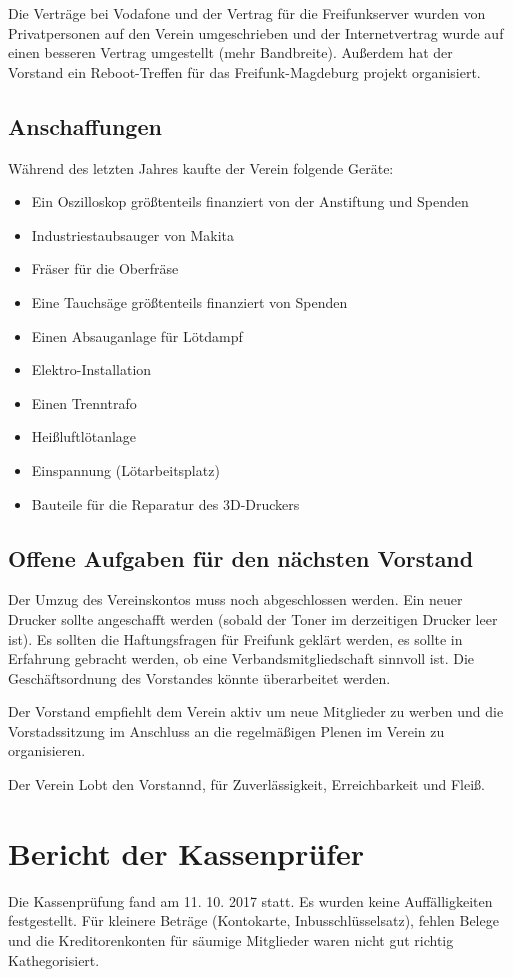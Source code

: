 \documentclass[a4paper,12pt,titlepage]{scrartcl}
\begin{document}
Die Verträge bei Vodafone und der Vertrag für die Freifunkserver wurden von Privatpersonen auf den Verein umgeschrieben und der Internetvertrag wurde auf einen besseren Vertrag umgestellt (mehr Bandbreite). Außerdem hat der Vorstand ein Reboot-Treffen für das Freifunk-Magdeburg projekt organisiert.


\subsection{Anschaffungen}

Während des letzten Jahres kaufte der Verein folgende Geräte:
\begin{itemize}
	\item Ein Oszilloskop größtenteils finanziert von der Anstiftung und Spenden
	\item Industriestaubsauger von Makita
	\item Fräser für die Oberfräse
	\item Eine Tauchsäge größtenteils finanziert von Spenden
	\item Einen Absauganlage für Lötdampf
	\item Elektro-Installation
	\item Einen Trenntrafo
	\item Heißluftlötanlage
	\item Einspannung (Lötarbeitsplatz)
	\item Bauteile für die Reparatur des 3D-Druckers
\end{itemize}

\subsection{Offene Aufgaben für den nächsten Vorstand}

Der Umzug des Vereinskontos muss noch abgeschlossen werden. Ein neuer Drucker
sollte angeschafft werden (sobald der Toner im derzeitigen Drucker leer ist).
Es sollten die Haftungsfragen für Freifunk geklärt werden, es sollte in Erfahrung gebracht werden, ob eine Verbandsmitgliedschaft sinnvoll ist.
Die Geschäftsordnung des Vorstandes könnte überarbeitet werden.


Der Vorstand empfiehlt dem Verein aktiv um neue Mitglieder zu werben und die Vorstadssitzung im Anschluss an die regelmäßigen Plenen im Verein zu organisieren.

Der Verein Lobt den Vorstannd, für Zuverlässigkeit, Erreichbarkeit und Fleiß.

\section{ Bericht der Kassenprüfer }
Die Kassenprüfung fand am 11. 10. 2017 statt. Es wurden keine Auffälligkeiten festgestellt.
Für kleinere Beträge (Kontokarte, Inbusschlüsselsatz), fehlen Belege und die Kreditorenkonten für säumige Mitglieder waren nicht gut richtig Kathegorisiert.
\end{document}
